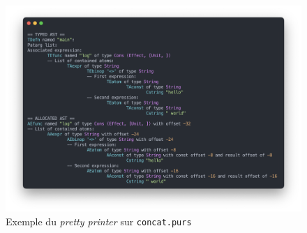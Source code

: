 \documentclass[12pt,a4paper]{article}
\begin{document}
\begin{figure}[!h]
    \center
    \includegraphics[scale=0.5]{pretty_printer.png}
    \caption{Exemple du \emph{pretty printer} sur \texttt{concat.purs}}
\end{figure}

\end{document}
